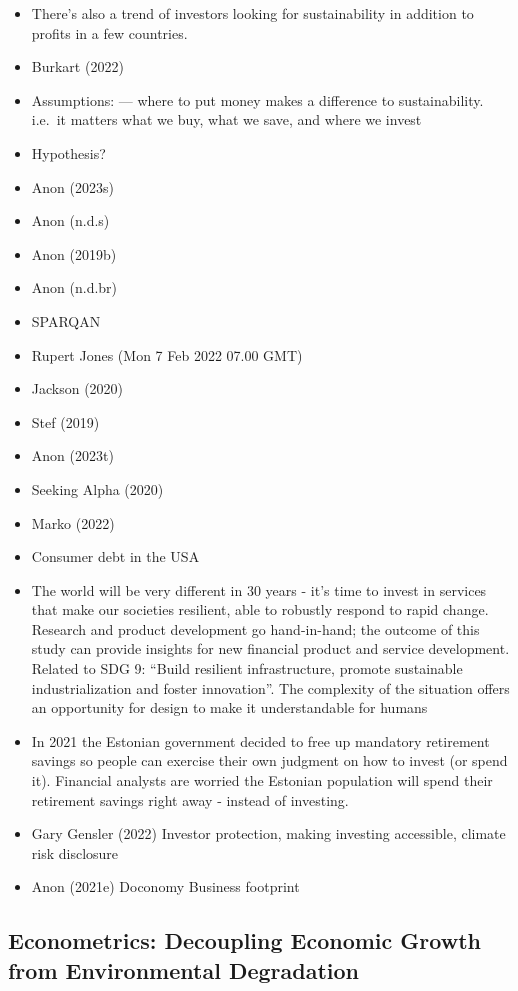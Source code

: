 \documentclass[
  letterpaper,
  DIV=11,
  numbers=noendperiod]{scrartcl}
\begin{document}
\begin{itemize}
\item
  There's also a trend of investors looking for sustainability in
  addition to profits in a few countries.
\item
  Burkart (2022)
\item
  Assumptions: --- where to put money makes a difference to
  sustainability. i.e.~it matters what we buy, what we save, and where
  we invest
\item
  Hypothesis?
\item
  Anon (2023s)
\item
  Anon (n.d.s)
\item
  Anon (2019b)
\item
  Anon (n.d.br)
\item
  SPARQAN
\item
  Rupert Jones (Mon 7 Feb 2022 07.00 GMT)
\item
  Jackson (2020)
\item
  Stef (2019)
\item
  Anon (2023t)
\item
  Seeking Alpha (2020)
\item
  Marko (2022)
\item
  Consumer debt in the USA
\item
  The world will be very different in 30 years - it's time to invest in
  services that make our societies resilient, able to robustly respond
  to rapid change. Research and product development go hand-in-hand; the
  outcome of this study can provide insights for new financial product
  and service development. Related to SDG 9: ``Build resilient
  infrastructure, promote sustainable industrialization and foster
  innovation''. The complexity of the situation offers an opportunity
  for design to make it understandable for humans
\item
  In 2021 the Estonian government decided to free up mandatory
  retirement savings so people can exercise their own judgment on how to
  invest (or spend it). Financial analysts are worried the Estonian
  population will spend their retirement savings right away - instead of
  investing.
\item
  Gary Gensler (2022) Investor protection, making investing accessible,
  climate risk disclosure
\item
  Anon (2021e) Doconomy Business footprint
\end{itemize}

\subsection{Econometrics: Decoupling Economic Growth from Environmental
Degradation}\label{econometrics-decoupling-economic-growth-from-environmental-degradation}
\end{document}
